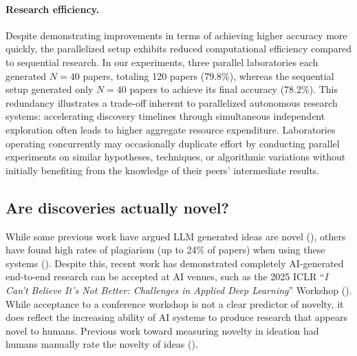 \documentclass[11pt, a4paper]{include/gdm_format}
\begin{document}
\paragraph{Research efficiency.}  
Despite demonstrating improvements in terms of achieving higher accuracy more quickly, the parallelized setup exhibits reduced computational efficiency compared to sequential research. In our experiments, three parallel laboratories each generated \(N=40\) papers, totaling 120 papers (79.8\%), whereas the sequential setup generated only \(N=40\) papers to achieve its final accuracy (78.2\%). This redundancy illustrates a trade-off inherent to parallelized autonomous research systems: accelerating discovery timelines through simultaneous independent exploration often leads to higher aggregate resource expenditure. Laboratories operating concurrently may occasionally duplicate effort by conducting parallel experiments on similar hypotheses, techniques, or algorithmic variations without initially benefiting from the knowledge of their peers' intermediate results. 


\subsection{Are discoveries actually novel?}
\label{subsec:arediscnovel}

While some previous work have argued LLM generated ideas are novel (\cite{si2024can, lu2024aiscientist, gottweis2025aicoscientist}), others have found high rates of plagiarism (up to 24\% of papers) when using these systems (\cite{gupta2025all}). Despite this, recent work has demonstrated completely AI-generated end-to-end research can be accepted at AI venues, such as the 2025 ICLR “\textit{I Can't Believe It's Not Better: Challenges in Applied Deep Learning}” Workshop (\citet{iclr2025aiscientist}). While acceptance to a conference workshop is not a clear predictor of novelty, it does reflect the increasing ability of AI systems to produce research that appears novel to humans. Previous work toward measuring novelty in ideation had humans manually rate the novelty of ideas (\cite{si2024can, gupta2025all}).
\end{document}
